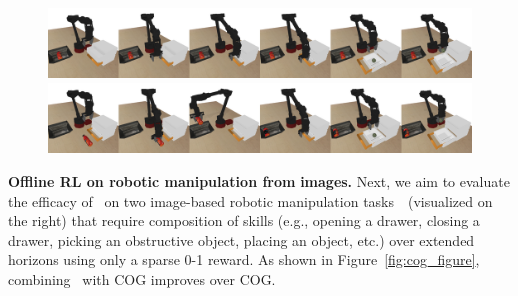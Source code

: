 


\begin{figure}
\small \begin{center}
\vspace{-30pt}
\includegraphics[width=0.99\linewidth]{chapters/dr3/figures/close_open_grasp.png}
\includegraphics[width=0.99\linewidth]{chapters/dr3/figures/pickplace_open_grasp.png}
\vspace{-20pt}
\end{center}
\end{figure}
\textbf{{Offline RL on robotic manipulation from}} \textbf{{images.}} Next, we aim to evaluate the efficacy of \drmethodname\ on two image-based robotic manipulation tasks~\citep{singh2020cog}~(visualized on the right) that require composition of skills (e.g., opening a drawer, closing a drawer, picking an obstructive object, placing an object, etc.) over extended horizons using only a sparse 0-1 reward. 
As shown in Figure~\ref{fig:cog_figure}, combining \drmethodname\ with COG improves over COG.

